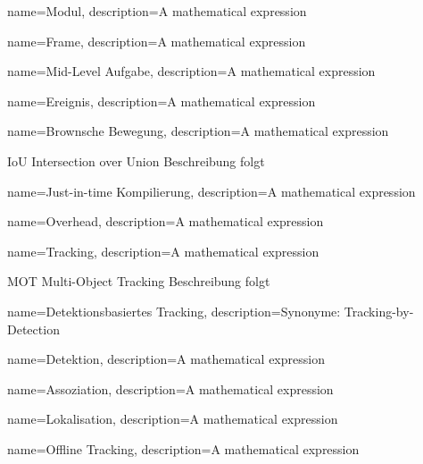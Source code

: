 
{
        name=Modul,
        description={A mathematical expression}
}

{
        name=Frame,
        description={A mathematical expression}
}

{
        name=Mid-Level Aufgabe,
        description={A mathematical expression}
}

{
        name=Ereignis,
        description={A mathematical expression}
}


{
        name=Brownsche Bewegung,
        description={A mathematical expression}
}

\newglossaryentrywithacronym
{IoU}
{Intersection over Union}
{Beschreibung folgt}

{
        name=Just-in-time Kompilierung,
        description={A mathematical expression}
}

{
        name=Overhead,
        description={A mathematical expression}
}



{
        name=Tracking,
        description={A mathematical expression}
}

\newglossaryentrywithacronym
{MOT}
{Multi-Object Tracking}
{Beschreibung folgt}

{
        name=Detektionsbasiertes Tracking,
        description={Synonyme: Tracking-by-Detection}
}

{
        name=Detektion,
        description={A mathematical expression}
}

{
        name=Assoziation,
        description={A mathematical expression}
}

{
        name=Lokalisation,
        description={A mathematical expression}
}

{
        name=Offline Tracking,
        description={A mathematical expression}
}

